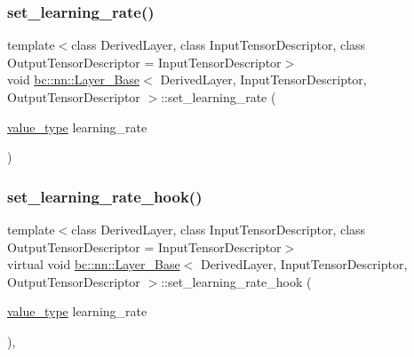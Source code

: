 \subsubsection{\texorpdfstring{set\+\_\+learning\+\_\+rate()}{set\_learning\_rate()}}
{\footnotesize\ttfamily template$<$class Derived\+Layer, class Input\+Tensor\+Descriptor, class Output\+Tensor\+Descriptor = Input\+Tensor\+Descriptor$>$ \\
void \hyperlink{structbc_1_1nn_1_1Layer__Base}{bc\+::nn\+::\+Layer\+\_\+\+Base}$<$ Derived\+Layer, Input\+Tensor\+Descriptor, Output\+Tensor\+Descriptor $>$\+::set\+\_\+learning\+\_\+rate (\begin{DoxyParamCaption}\item[{\hyperlink{structbc_1_1nn_1_1Layer__Base_a64df0ea9c50a4d6dcf59483cc797c393}{value\+\_\+type}}]{learning\+\_\+rate }\end{DoxyParamCaption})\hspace{0.3cm}{\ttfamily [inline]}}

\mbox{\label{structbc_1_1nn_1_1Layer__Base_a126da3cf45e1b4a24deeff82c93772ce}} 
\subsubsection{\texorpdfstring{set\+\_\+learning\+\_\+rate\+\_\+hook()}{set\_learning\_rate\_hook()}}
{\footnotesize\ttfamily template$<$class Derived\+Layer, class Input\+Tensor\+Descriptor, class Output\+Tensor\+Descriptor = Input\+Tensor\+Descriptor$>$ \\
virtual void \hyperlink{structbc_1_1nn_1_1Layer__Base}{bc\+::nn\+::\+Layer\+\_\+\+Base}$<$ Derived\+Layer, Input\+Tensor\+Descriptor, Output\+Tensor\+Descriptor $>$\+::set\+\_\+learning\+\_\+rate\+\_\+hook (\begin{DoxyParamCaption}\item[{\hyperlink{structbc_1_1nn_1_1Layer__Base_a64df0ea9c50a4d6dcf59483cc797c393}{value\+\_\+type}}]{learning\+\_\+rate }\end{DoxyParamCaption})\hspace{0.3cm}{\ttfamily [inline]}, {\ttfamily [virtual]}}



